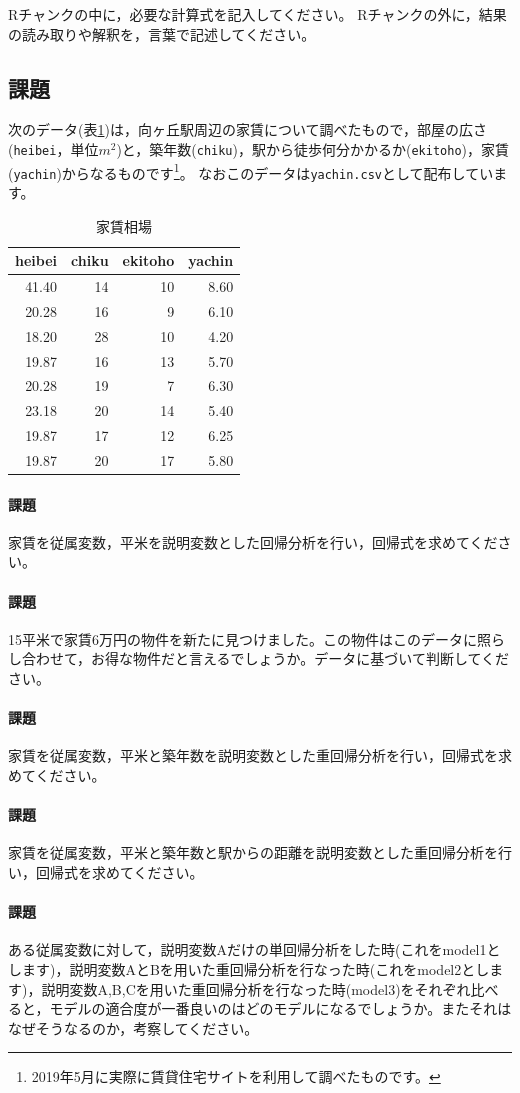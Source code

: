 \documentclass{ltjbook}
\begin{document}
Rチャンクの中に，必要な計算式を記入してください。
Rチャンクの外に，結果の読み取りや解釈を，言葉で記述してください。



\subsection{課題}
次のデータ(表\ref{tbl::ex11_01})は，向ヶ丘駅周辺の家賃について調べたもので，部屋の広さ(\verb|heibei|，単位$m^2$)と，築年数(\verb|chiku|)，駅から徒歩何分かかるか(\verb|ekitoho|)，家賃(\verb|yachin|)からなるものです\footnote{2019年5月に実際に賃貸住宅サイトを利用して調べたものです。}。
なおこのデータは\texttt{yachin.csv}として配布しています。
\begin{table}
    \caption{家賃相場}
    \centering
    \begin{tabular}[t]{rrrr}
    \hline
    heibei & chiku & ekitoho & yachin\\
    \hline
    41.40 & 14 & 10 & 8.60\\
    20.28 & 16 & 9 & 6.10\\
    18.20 & 28 & 10 & 4.20\\
    19.87 & 16 & 13 & 5.70\\
    20.28 & 19 & 7 & 6.30\\
    23.18 & 20 & 14 & 5.40\\
    19.87 & 17 & 12 & 6.25\\
    19.87 & 20 & 17 & 5.80\\
    \hline
    \end{tabular}
    \label{tbl::ex11_01}
    \end{table}
\paragraph{課題}家賃を従属変数，平米を説明変数とした回帰分析を行い，回帰式を求めてください。
\paragraph{課題}15平米で家賃6万円の物件を新たに見つけました。この物件はこのデータに照らし合わせて，お得な物件だと言えるでしょうか。データに基づいて判断してください。
\paragraph{課題}家賃を従属変数，平米と築年数を説明変数とした重回帰分析を行い，回帰式を求めてください。
\paragraph{課題}家賃を従属変数，平米と築年数と駅からの距離を説明変数とした重回帰分析を行い，回帰式を求めてください。
\paragraph{課題}ある従属変数に対して，説明変数Aだけの単回帰分析をした時(これをmodel1とします)，説明変数AとBを用いた重回帰分析を行なった時(これをmodel2とします)，説明変数A,B,Cを用いた重回帰分析を行なった時(model3)をそれぞれ比べると，モデルの適合度が一番良いのはどのモデルになるでしょうか。またそれはなぜそうなるのか，考察してください。
\end{document}
